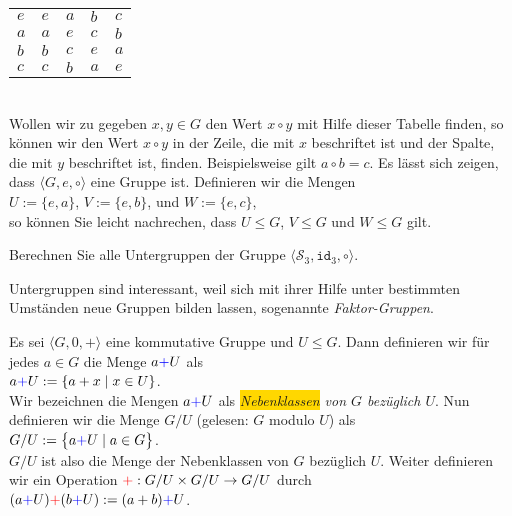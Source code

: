 \begin{enumerate}
\begin{tabular}[t]{l|llll}
      \hline
          $e$ & $e$ & $a$ & $b$ & $c$ \\
          $a$ & $a$ & $e$ & $c$ & $b$ \\
          $b$ & $b$ & $c$ & $e$ & $a$ \\
          $c$ & $c$ & $b$ & $a$ & $e$ \\
      \end{tabular}
      \\[0.2cm]
      Wollen wir zu gegeben $x,y \in G$ den Wert $x \circ y$ mit Hilfe dieser Tabelle finden, so k\"{o}nnen
      wir den Wert $x \circ y$ in der Zeile, die mit $x$ beschriftet ist und der Spalte, die mit $y$
      beschriftet ist, finden.  Beispielsweise gilt $a \circ b = c$.  Es l\"{a}sst sich zeigen, dass
      $\langle G, e, \circ \rangle$ eine Gruppe ist.  Definieren wir die Mengen
      \\[0.2cm]
      \hspace*{1.3cm} $U := \{ e, a \}$, \quad $V := \{ e, b \}$, \quad und \quad $W := \{ e, c \}$, 
      \\[0.2cm]
      so k\"{o}nnen Sie leicht nachrechen, dass 
      $U \leq G$, $V \leq G$ und $W \leq G$ gilt.
      \eox
\end{enumerate}

\exercise
Berechnen Sie alle Untergruppen der Gruppe $\langle \mathcal{S}_3, \mathtt{id}_3, \circ \rangle$.
\exend
\vspace*{0.3cm}

Untergruppen sind interessant, weil sich mit ihrer Hilfe unter bestimmten Umst\"{a}nden 
neue Gruppen bilden lassen, sogenannte \emph{Faktor-Gruppen}.

\begin{Definition}
  Es sei $\langle G, 0, + \rangle$ eine kommutative Gruppe und $U \leq G$.
  Dann definieren wir f\"{u}r jedes $a \in G$ die Menge $a{\color{blue}{+}}U$ als
  \\[0.2cm]
  \hspace*{1.3cm}
  $a {\color{blue}{+}} U := \{ a + x \mid x \in U \}$.
  \\[0.2cm]
  Wir bezeichnen die Mengen $a {\color{blue}{+}} U$ als \emph{\colorbox{gold}{Nebenklassen} von $G$ bez\"{u}glich $U$}.
  Nun definieren wir die Menge $G/U$ (gelesen: $G$ modulo $U$) als
  \\[0.2cm]
  \hspace*{1.3cm}
  $G/U := \bigl\{ a {\color{blue}{+}} U \mid a \in G \bigr\}$.
  \\[0.2cm]
  $G/U$ ist also die Menge der Nebenklassen von $G$ bez\"{u}glich $U$.
  Weiter definieren wir ein Operation ${\color{red}{+}}: G/U \times G/U \rightarrow G/U$ durch
  \\[0.2cm]
  \hspace*{1.3cm}
  $(a {\color{blue}{+}} U) {\color{red}{+}} (b {\color{blue}{+}} U) := (a + b) {\color{blue}{+}} U$.
\end{Definition}

